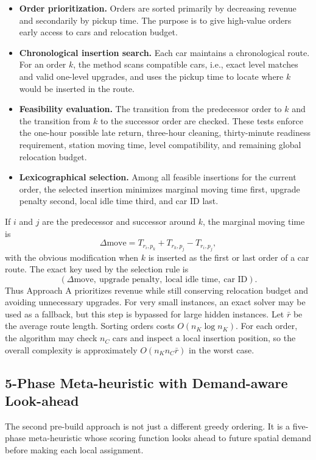 \documentclass[10pt,a4paper]{article}
\begin{document}
\begin{itemize}
    \item \textbf{Order prioritization.} Orders are sorted primarily by
    decreasing revenue and secondarily by pickup time.  The purpose is to give
    high-value orders early access to cars and relocation budget.
    \item \textbf{Chronological insertion search.} Each car maintains a
    chronological route.  For an order $k$, the method scans compatible cars,
    i.e., exact level matches and valid one-level upgrades, and uses the pickup
    time to locate where $k$ would be inserted in the route.
    \item \textbf{Feasibility evaluation.} The transition from the predecessor
    order to $k$ and the transition from $k$ to the successor order are checked.
    These tests enforce the one-hour possible late return, three-hour cleaning,
    thirty-minute readiness requirement, station moving time, level
    compatibility, and remaining global relocation budget.
    \item \textbf{Lexicographical selection.} Among all feasible insertions for
    the current order, the selected insertion minimizes marginal moving time
    first, upgrade penalty second, local idle time third, and car ID last.
\end{itemize}

If $i$ and $j$ are the predecessor and successor around $k$, the marginal moving
time is
\[
\Delta\text{move}=T_{r_i,p_k}+T_{r_k,p_j}-T_{r_i,p_j},
\]
with the obvious modification when $k$ is inserted as the first or last order of
a car route.
The exact key used by the selection rule is
\[
(\Delta\text{move},\ \text{upgrade penalty},\ \text{local idle time},\ \text{car ID}).
\]
Thus Approach A prioritizes revenue while still conserving relocation budget and
avoiding unnecessary upgrades.  For very small instances, an exact solver may be
used as a fallback, but this step is bypassed for large hidden instances.  Let
$\bar r$ be the average route length.  Sorting orders costs $O(n_K\log n_K)$.
For each order, the algorithm may check $n_C$ cars and inspect a local insertion
position, so the overall complexity is approximately $O(n_K n_C \bar r)$ in the
worst case.

\subsection*{5-Phase Meta-heuristic with Demand-aware Look-ahead}

The second pre-build approach is not just a different greedy ordering.  It is a
five-phase meta-heuristic whose scoring function looks ahead to future spatial
demand before making each local assignment.
\end{document}
